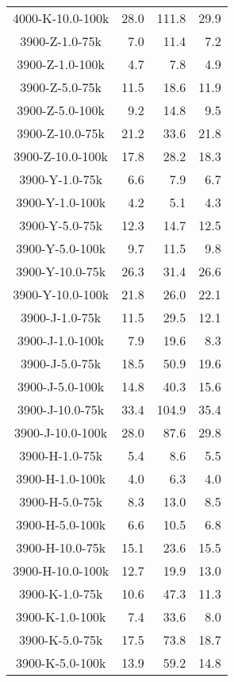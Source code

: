 \begin{longtable}{crrr}
    4000-K-10.0-100k &   28.0 &  111.8 &   29.9 \\
    3900-Z-1.0-75k   &    7.0 &   11.4 &    7.2 \\
    3900-Z-1.0-100k  &    4.7 &    7.8 &    4.9 \\
    3900-Z-5.0-75k   &   11.5 &   18.6 &   11.9 \\
    3900-Z-5.0-100k  &    9.2 &   14.8 &    9.5 \\
    3900-Z-10.0-75k  &   21.2 &   33.6 &   21.8 \\
    3900-Z-10.0-100k &   17.8 &   28.2 &   18.3 \\
    3900-Y-1.0-75k   &    6.6 &    7.9 &    6.7 \\
    3900-Y-1.0-100k  &    4.2 &    5.1 &    4.3 \\
    3900-Y-5.0-75k   &   12.3 &   14.7 &   12.5 \\
    3900-Y-5.0-100k  &    9.7 &   11.5 &    9.8 \\
    3900-Y-10.0-75k  &   26.3 &   31.4 &   26.6 \\
    3900-Y-10.0-100k &   21.8 &   26.0 &   22.1 \\
    3900-J-1.0-75k   &   11.5 &   29.5 &   12.1 \\
    3900-J-1.0-100k  &    7.9 &   19.6 &    8.3 \\
    3900-J-5.0-75k   &   18.5 &   50.9 &   19.6 \\
    3900-J-5.0-100k  &   14.8 &   40.3 &   15.6 \\
    3900-J-10.0-75k  &   33.4 &  104.9 &   35.4 \\
    3900-J-10.0-100k &   28.0 &   87.6 &   29.8 \\
    3900-H-1.0-75k   &    5.4 &    8.6 &    5.5 \\
    3900-H-1.0-100k  &    4.0 &    6.3 &    4.0 \\
    3900-H-5.0-75k   &    8.3 &   13.0 &    8.5 \\
    3900-H-5.0-100k  &    6.6 &   10.5 &    6.8 \\
    3900-H-10.0-75k  &   15.1 &   23.6 &   15.5 \\
    3900-H-10.0-100k &   12.7 &   19.9 &   13.0 \\
    3900-K-1.0-75k   &   10.6 &   47.3 &   11.3 \\
    3900-K-1.0-100k  &    7.4 &   33.6 &    8.0 \\
    3900-K-5.0-75k   &   17.5 &   73.8 &   18.7 \\
    3900-K-5.0-100k  &   13.9 &   59.2 &   14.8 \\

\end{longtable}
